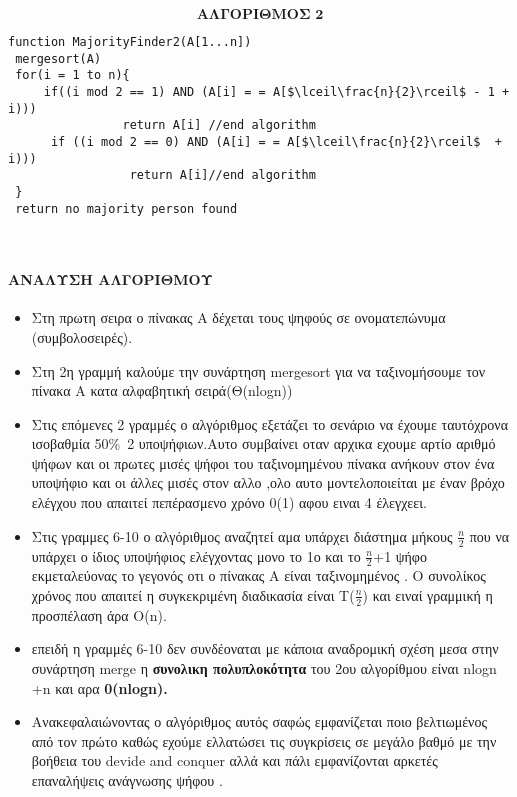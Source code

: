 \documentclass[a4paper, fleqn]{article}
\begin{document}
          $$ \textbf{ΑΛΓΟΡΙΘΜΟΣ 2}$$

\lstset{numbers=left, numbersep=5pt,frame=single,  framexleftmargin=15pt}


\begin{lstlisting}[mathescape]
function MajorityFinder2(A[1...n])
 mergesort(A)
 for(i = 1 to n){
     if((i mod 2 == 1) AND (A[i] = = A[$\lceil\frac{n}{2}\rceil$ - 1 + i)))		
                return A[i] //end algorithm
      if ((i mod 2 == 0) AND (A[i] = = A[$\lceil\frac{n}{2}\rceil$  + i)))
                 return A[i]//end algorithm
 }
 return no majority person found
 
  
\end{lstlisting}
\paragraph{    ΑΝΑΛΥΣΗ ΑΛΓΟΡΙΘΜΟΥ}
\begin{itemize}
    \item Στη πρωτη σειρα ο πίνακας Α δέχεται τους ψηφούς σε ονοματεπώνυμα (συμβολοσειρές).
\end{itemize}
\begin{itemize}
    \item Στη 2η γραμμή καλούμε την συνάρτηση  mergesort για να ταξινομήσουμε τον πίνακα Α κατα αλφαβητική σειρά(Θ(nlogn))
    \item Στις επόμενες 2 γραμμές ο αλγόριθμος εξετάζει το σενάριο να έχουμε ταυτόχρονα ισοβαθμία 50\%\ 2 υποψήφιων.Αυτο συμβαίνει οταν αρχικα εχουμε αρτίο αριθμό ψήφων και οι πρωτες μισές ψήφοι του ταξινομημένου πίνακα ανήκουν στον ένα υποψήφιο και οι άλλες μισές στον αλλο ,ολο αυτο μοντελοποιείται με έναν βρόχο ελέγχου που απαιτεί πεπέρασμενο  χρόνο 0(1) αφου ειναι 4 έλεγχεει.
    \item  Στις γραμμες 6-10 ο αλγόριθμος αναζητεί αμα υπάρχει διάστημα μήκους $\frac{n}{2}$ που να υπάρχει ο ίδιος υποψήφιος  ελέγχοντας μονο το 1ο και το $\frac{n}{2}$+1 ψήφο εκμεταλεύονας το γεγονός οτι ο πίνακας Α είναι ταξινομημένος . Ο συνολίκος χρόνος που απαιτεί η συγκεκριμένη διαδικασία είναι Τ($\frac{n}{2}$) και ειναί γραμμική η προσπέλαση άρα Ο(n).
    \item  επειδή η γραμμές 6-10 δεν συνδέοναται με κάποια αναδρομική σχέση μεσα στην συνάρτηση merge η \textbf{συνολικη πολυπλοκότητα} του 2ου αλγορίθμου είναι nlogn +n και αρα \textbf{0(nlogn).}
    \item Aνακεφαλαιώνοντας ο αλγόριθμος αυτός σαφώς εμφανίζεται ποιο βελτιωμένος από τον πρώτο καθώς εχούμε ελλατώσει τις συγκρίσεις σε μεγάλο βαθμό με την βοήθεια του devide and conquer αλλά και πάλι εμφανίζονται αρκετές επαναλήψεις ανάγνωσης ψήφου .
\end{itemize}
\end{document}
